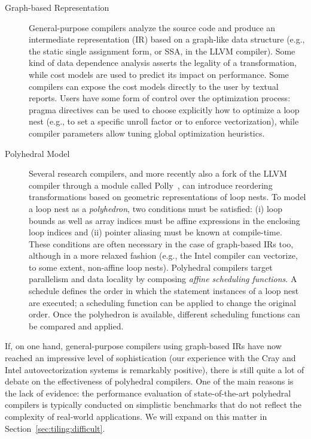 \begin{description}
\item[Graph-based Representation] General-purpose compilers analyze the source code and produce an intermediate representation (IR) based on a graph-like data structure (e.g., the static single assignment form, or SSA, in the LLVM compiler). Some kind of data dependence analysis asserts the legality of a transformation, while cost models are used to predict its impact on performance. Some compilers can expose the cost models directly to the user by textual reports. Users have some form of control over the optimization process: pragma directives can be used to choose explicitly how to optimize a loop nest (e.g., to set a specific unroll factor or to enforce vectorization), while compiler parameters allow tuning global optimization heuristics. 
\item[Polyhedral Model] Several research compilers, and more recently also a fork of the LLVM compiler through a module called Polly~\citep{polly}, can introduce reordering transformations based on geometric representations of loop nests. To model a loop nest as a {\em polyhedron}, two conditions must be satisfied: (i) loop bounds as well as array indices must be affine expressions in the enclosing loop indices and (ii) pointer aliasing must be known at compile-time. These conditions are often necessary in the case of graph-based IRs too, although in a more relaxed fashion (e.g., the Intel compiler can vectorize, to some extent, non-affine loop nests). Polyhedral compilers target parallelism and data locality by composing {\em affine scheduling functions}. A schedule defines the order in which the statement instances of a loop nest are executed; a scheduling function can be applied to change the original order. Once the polyhedron is available, different scheduling functions can be compared and applied.
\end{description}


If, on one hand, general-purpose compilers using graph-based IRs have now reached an impressive level of sophistication (our experience with the Cray and Intel autovectorization systems is remarkably positive), there is still quite a lot of debate on the effectiveness of polyhedral compilers. One of the main reasons is the lack of evidence: the performance evaluation of state-of-the-art polyhedral compilers is typically conducted on simplistic benchmarks that do not reflect the complexity of real-world applications. We will expand on this matter in Section~\ref{sec:tiling:difficult}.

